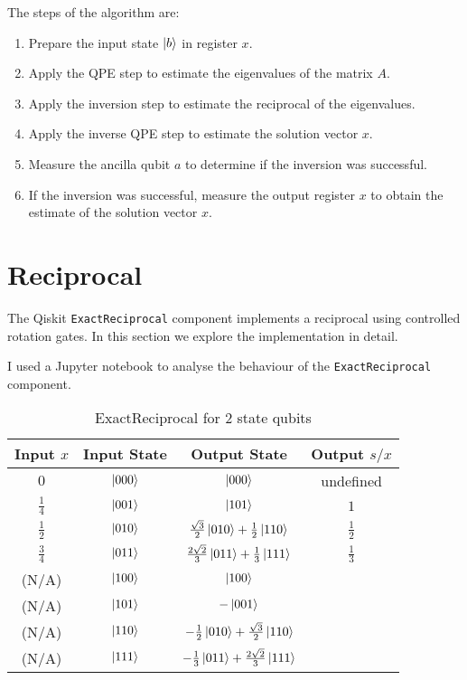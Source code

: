 \documentclass[12pt]{extarticle}
\begin{document}
The steps of the algorithm are:
\begin{enumerate}
    \item Prepare the input state $\ket{b}$ in register $x$.
    \item Apply the QPE step to estimate the eigenvalues of the matrix $A$.
    \item Apply the inversion step to estimate the reciprocal of the eigenvalues.
    \item Apply the inverse QPE step to estimate the solution vector $x$.
    \item Measure the ancilla qubit $a$ to determine if the inversion was successful.
    \item If the inversion was successful, measure the output register $x$ to obtain the estimate of the solution vector $x$.
\end{enumerate}

\section{Reciprocal}\label{sec:reciprocal}

The Qiskit \texttt{ExactReciprocal} component \cite{ibm_exact_reciprocal} implements a reciprocal using controlled rotation gates.
In this section we explore the implementation in detail.

I used a Jupyter notebook \cite{github_project_exactreciprocal_matrix} to analyse the behaviour of the \texttt{ExactReciprocal} component.

\begin{table}[h!]
\centering
\begin{tabular}{|c|c|c|c|}
\hline
Input $x$     & Input State  & Output State                                              & Output $s/x$  \\
\hline
$0$           &  $\ket{000}$ &  $\ket{000}$                                              & undefined     \\
$\frac{1}{4}$ &  $\ket{001}$ &  $\ket{101}$                                              & $1$           \\
$\frac{1}{2}$ &  $\ket{010}$ & $\frac{\sqrt{3}}{2} \ket{010} + \frac{1}{2} \ket{110}$    & $\frac{1}{2}$ \\
$\frac{3}{4}$ &  $\ket{011}$ & $\frac{2 \sqrt{2}}{3} \ket{011} + \frac{1}{3} \ket{111}$  & $\frac{1}{3}$ \\
(N/A)         &  $\ket{100}$ & $\ket{100}$                                               & \\
(N/A)         &  $\ket{101}$ & $-\ket{001}$                                              & \\
(N/A)         &  $\ket{110}$ & $-\frac{1}{2} \ket{010} + \frac{\sqrt{3}}{2} \ket{110}$   & \\
(N/A)         &  $\ket{111}$ & $-\frac{1}{3} \ket{011} + \frac{2 \sqrt{2}}{3} \ket{111}$ & \\
\hline
\end{tabular}
\caption{ExactReciprocal for 2 state qubits}
\label{tab:exactreciprocal2}
\end{table}
\end{document}
